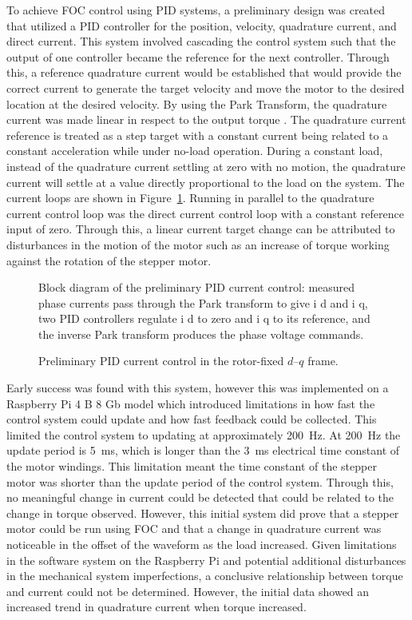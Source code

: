 To achieve FOC control using PID systems, a preliminary design was created that utilized a PID controller for the position, velocity, quadrature current, and direct current. This system involved cascading the control system such that the output of one controller became the reference for the next controller. Through this, a reference quadrature current would be established that would provide the correct current to generate the target velocity and move the motor to the desired location at the desired velocity. By using the Park Transform, the quadrature current was made linear in respect to the output torque \cite{benchaib_discrete-time_2003,derammelaere_linear_2010}. The quadrature current reference is treated as a step target with a constant current being related to a constant acceleration while under no-load operation. During a constant load, instead of the quadrature current settling at zero with no motion, the quadrature current will settle at a value directly proportional to the load on the system. The current loops are shown in Figure~\ref{fig:pid_current_loop}. Running in parallel to the quadrature current control loop was the direct current control loop with a constant reference input of zero. Through this, a linear current target change can be attributed to disturbances in the motion of the motor such as an increase of torque working against the rotation of the stepper motor.


\begin{figure}[htbp]
	\centering
		{Block diagram of the preliminary PID current control: measured phase currents pass through the Park transform to give i d and i q, two PID controllers regulate i d to zero and i q to its reference, and the inverse Park transform produces the phase voltage commands.}
	\caption[Preliminary PID current control]{Preliminary PID current control in the rotor-fixed $d$--$q$ frame.}
	\label{fig:pid_current_loop}
\end{figure}

Early success was found with this system, however this was implemented on a Raspberry Pi 4 B 8 Gb model which introduced limitations in how fast the control system could update and how fast feedback could be collected. This limited the control system to updating at approximately \SI{200}{\hertz}. At \SI{200}{\hertz} the update period is \SI{5}{\milli\second}, which is longer than the \SI{3}{\milli\second} electrical time constant of the motor windings. This limitation meant the time constant of the stepper motor was shorter than the update period of the control system. Through this, no meaningful change in current could be detected that could be related to the change in torque observed. However, this initial system did prove that a stepper motor could be run using FOC and that a change in quadrature current was noticeable in the offset of the waveform as the load increased. Given limitations in the software system on the Raspberry Pi and potential additional disturbances in the mechanical system imperfections, a conclusive relationship between torque and current could not be determined. However, the initial data showed an increased trend in quadrature current when torque increased. 

